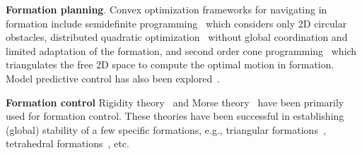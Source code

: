 \textbf{Formation planning}.
Convex optimization frameworks for navigating in formation include semidefinite programming~\cite{Derenick:2010cc} which considers only 2D circular obstacles, distributed quadratic optimization~\cite{AlonsoMora:2015wi} without global coordination and limited adaptation of the formation,
and second order cone programming~\cite{Derenick:ha} which triangulates the free 2D space to compute the optimal motion in formation. Model predictive control has also been explored~\cite{Dunbar:2002fh}.

\textbf{Formation control} Rigidity theory~\cite{Eren.Belhumeur.ea:02} and Morse theory~\cite{Anderson:11} have been primarily used for formation control. These theories have been successful in establishing (global) stability of a few specific formations, e.g., triangular formations~\cite{Cao.Morse.ea:11}, tetrahedral formations~\cite{Anderson.Yu.ea:10}, etc.
